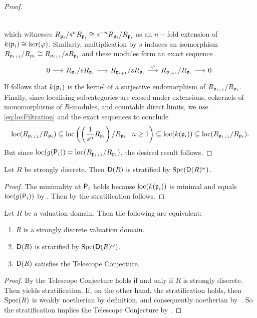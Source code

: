 \documentclass[reqno,a4paper]{amsart}
\begin{document}
\begin{proof}
\[\begin{tikzcd}[row sep=0.5cm,column sep=0.5cm]
\end{tikzcd}
\]
which witnesses $R_{\mathfrak{p}_{i}}/s^nR_{\mathfrak{p}_{i}}\cong s^{-n}R_{\mathfrak{p}_{i}}/R_{\mathfrak{p}_{i}}$ as an $n-$fold extension of $k(\mathfrak{p}_i)\cong\mathrm{ker}(\varphi)$.
Similarly, multiplication by $s$ induces an isomorphism $R_{\mathfrak{p}_{i+1}}/R_{\mathfrak{p}_{i}}\cong R_{\mathfrak{p}_{i+1}}/sR_{\mathfrak{p}_{i}}$ and these modules form an exact sequence
\[
\begin{tikzcd}[row sep=0.5cm,column sep=0.5cm]
0 \arrow[r] & R_{\fp_{i}}/sR_{\fp_{i}} \arrow[r] & R_{\fp_{i+1}}/sR_{\fp_{i}} \arrow[r, "\psi"] & R_{\fp_{i+1}}/R_{\fp_{i}} \arrow[r] & 0.
\end{tikzcd}
\]
If follows that $k(\mathfrak{p}_i)$ is the kernel of a surjective endomorphism of $R_{\mathfrak{p}_{i+1}}/R_{\mathfrak{p}_{i}}$.
Finally, since localising subcategories are closed under extensions, cokernels of monomorphisms of $R$-modules, and countable direct limits, we use \eqref{eq:locFiltration} and the exact sequences to conclude 
\[
\operatorname{loc}(R_{\mathfrak{p}_{i+1}}/R_{\mathfrak{p}_{i}})\subseteq 
\operatorname{loc}\left(\left(\frac{1}{s^n}R_{\mathfrak{p}_{i}}\right)/R_{\mathfrak{p}_{i}}\mid n\ge1\right)\subseteq \operatorname{loc}(k(\mathfrak{p}_i))\subseteq\operatorname{loc}(R_{\mathfrak{p}_{i+1}}/R_{\mathfrak{p}_{i}}). 
\]
But since $\operatorname{loc}(g(\mathsf{P}_i))=\operatorname{loc}(R_{\mathfrak{p}_{i+1}}/R_{\mathfrak{p}_{i}})$, the desired result follows.
\end{proof}
\begin{proposition}\label{thm:strongStratified}
Let $R$ be strongly discrete. Then $\mathsf{D}(R)$ is stratified by $\operatorname{Spc}(\mathsf{D}(R)^\omega)$.
\end{proposition}
\begin{proof}
The minimality at $\mathsf{P}_i$ holds because $\operatorname{loc}(k(\mathfrak{p}_i))$ is minimal and equals $\operatorname{loc}(g(\mathsf{P}_i))$ by . Then by  the stratification follows.
\end{proof}
\begin{theorem}\label{cor:classificationOfStratificationForVD}
Let $R$ be a valuation domain. Then the following are equivalent:
\begin{enumerate}
    \item $R$ is a strongly discrete valuation domain.
    \item $\mathsf{D}(R)$ is stratified by $\operatorname{Spc}(\mathsf{D}(R)^\omega)$.
    \item $\mathsf{D}(R)$ satisfies the Telescope Conjecture.
\end{enumerate}
\end{theorem}
\begin{proof}
By \cite[\S7]{gldm1} the Telescope Conjecture holds if and only if $R$ is strongly discrete. Then  yields stratification.
If, on the other hand, the stratification holds, then $\operatorname{Spec}(R)$ is weakly noetherian by definition, and consequently noetherian by~.
So the stratification implies the Telescope Conjecture by \cite[Theorem~9.11]{bhs23}.
\end{proof}
\end{document}
